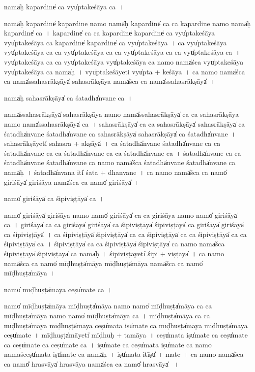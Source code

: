 \documentclass[parskip, DIV=14]{scrartcl}
\begin{document}
{nama̍ḥ kapa॒rdine̍ ca॒ vyu̍ptakeśāya ca॒~।

nama̍ḥ kapa॒rdine̍ kapa॒rdine॒ namo॒ nama̍ḥ kapa॒rdine̍ ca ca kapa॒rdine॒ namo॒ nama̍ḥ kapa॒rdine̍ ca~।
ka॒pa॒rdine̍ ca ca kapa॒rdine̍ kapa॒rdine̍ ca॒ vyu̍ptakeśāya॒ vyu̍ptakeśāya ca kapa॒rdine̍ kapa॒rdine̍ ca॒ vyu̍ptakeśāya~।
ca॒ vyu̍ptakeśāya॒ vyu̍ptakeśāya ca ca॒  vyu̍ptakeśāya ca ca॒ vyu̍ptakeśāya ca ca॒  vyu̍ptakeśāya ca~।
vyu̍ptakeśāya ca ca॒  vyu̍ptakeśāya॒ vyu̍ptakeśāya ca॒ namo॒ nama̍śca॒ vyu̍ptakeśāya॒ vyu̍ptakeśāya ca॒ nama̍ḥ~।
vyu̍ptakeśā॒yeti॒ vyu̍pta + ke॒śā॒ya॒~।
ca॒ namo॒ nama̍śca ca॒ nama̍ssahasrā॒kṣāya̍ sahasrā॒kṣāya॒ nama̍śca ca॒ nama̍ssahasrā॒kṣāya̍~।

nama̍ḥ sahasrā॒kṣāya̍ ca śa॒tadha̍nvane ca॒~।

nama̍ssahasrā॒kṣāya̍ sahasrā॒kṣāya॒ namo॒ nama̍ssahasrā॒kṣāya̍ ca ca sahasrā॒kṣāya॒ namo॒ nama̍ssahasrā॒kṣāya̍ ca~।
sa॒ha॒srā॒kṣāya̍ ca ca sahasrā॒kṣāya̍ sahasrā॒kṣāya̍ ca śa॒tadha̍nvane śa॒tadha̍nvane ca sahasrā॒kṣāya̍ sahasrā॒kṣāya̍ ca śa॒tadha̍nvane~।
sa॒ha॒srā॒kṣāyeti̍ sahasra + a॒kṣāya̍~।
ca॒ śa॒tadha̍nvane śa॒tadha̍nvane ca ca śa॒tadha̍nvane ca ca śa॒tadha̍nvane ca ca śa॒tadha̍nvane ca~।
śa॒tadha̍nvane ca ca śa॒tadha̍nvane śa॒tadha̍nvane ca॒ namo॒ nama̍śca śa॒tadha̍nvane śa॒tadha̍nvane ca॒ nama̍ḥ~।
śa॒tadha̍nvana॒ iti̍ śa॒ta + dha॒nva॒ne॒~।
ca॒ namo॒ nama̍śca ca॒ namo̍ giri॒śāya̍ giri॒śāya॒ nama̍śca ca॒ namo̍ giri॒śāya̍~।

namo̍ giri॒śāya̍ ca śipivi॒ṣṭāya̍ ca॒~।

namo̍ giri॒śāya̍ giri॒śāya॒ namo॒ namo̍ giri॒śāya̍ ca ca giri॒śāya॒ namo॒ namo̍ giri॒śāya̍ ca~।
gi॒ri॒śāya̍ ca ca giri॒śāya̍ giri॒śāya̍ ca śipivi॒ṣṭāya̍ śipivi॒ṣṭāya̍ ca giri॒śāya̍ giri॒śāya̍ ca śipivi॒ṣṭāya̍~।
ca॒ śi॒pi॒vi॒ṣṭāya̍ śipivi॒ṣṭāya̍ ca ca śipivi॒ṣṭāya̍ ca ca śipivi॒ṣṭāya̍ ca ca śipivi॒ṣṭāya̍ ca~।
śi॒pi॒vi॒ṣṭāya̍ ca ca śipivi॒ṣṭāya̍ śipivi॒ṣṭāya̍ ca॒ namo॒ nama̍śca śipivi॒ṣṭāya̍ śipivi॒ṣṭāya̍ ca॒ nama̍ḥ~।
śi॒pi॒vi॒ṣṭāyeti̍ śipi + vi॒ṣṭāya̍~।
ca॒ namo॒ nama̍śca ca॒ namo̍ mī॒ḍhuṣṭa̍māya mī॒ḍhuṣṭa̍māya॒ nama̍śca ca॒ namo̍ mī॒ḍhuṣṭa̍māya~।

namo̍ mī॒ḍhuṣṭa̍māya॒ ceṣu̍mate ca॒~।

namo̍ mī॒ḍhuṣṭa̍māya mī॒ḍhuṣṭa̍māya॒ namo॒ namo̍ mī॒ḍhuṣṭa̍māya ca ca mī॒ḍhuṣṭa̍māya॒ namo॒ namo̍ mī॒ḍhuṣṭa̍māya ca~।
mī॒ḍhuṣṭa̍māya ca ca  mī॒ḍhuṣṭa̍māya mī॒ḍhuṣṭa̍māya॒ ceṣu̍mata॒ iṣu̍mate ca  mī॒ḍhuṣṭa̍māya mī॒ḍhuṣṭa̍māya॒ ceṣu̍mate~।
mī॒ḍhuṣṭa̍mā॒yeti̍ mī॒ḍhuḥ + ta॒mā॒ya॒~।
ceṣu̍mata॒ iṣu̍mate ca॒ ceṣu̍mate ca॒ ceṣu̍mate ca॒ ceṣu̍mate ca~। 
iṣu̍mate  ca॒ ceṣu̍mata॒ iṣu̍mate ca॒ namo॒ nama॒śceṣu̍mata॒ iṣu̍mate ca॒ nama̍ḥ~।
iṣu̍mata॒ itīṣu̍ + ma॒te॒~। 
ca॒ namo॒ nama̍śca ca॒ namo̎ hra॒svāya̍ hra॒svāya॒  nama̍śca ca॒ namo̎ hra॒svāya̍ ~।

}
\end{document}
